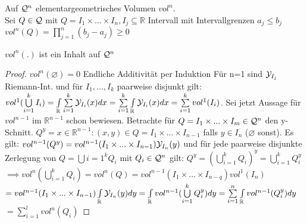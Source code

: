 \documentclass[11pt,a4paper,fleqn,openany]{report}
\begin{document}
    \begin{example}
      Auf $\mathcal{Q}^n$ elementargeometrisches Volumen $vol^n$.\\
      Sei $Q \in \mathcal{Q}$ mit $Q = I_1 \times ... \times I_n, I_j \subseteq \mathbb{R}$ Intervall mit Intervallgrenzen $a_j \leq b_j$\\
      $vol^n(Q) = \prod\limits_{j=1}^n (b_j - a_j) \geq 0$
    \end{example}

    \begin{theorem}[i.A. II.28]
      $vol^n(.)$ ist ein Inhalt auf $\mathcal{Q}^n$
    \end{theorem}

    \begin{proof}
      $vol^n(\varnothing) = 0$ \newline
      Endliche Additivität per Induktion \newline
      Für n=1 sind $\mathcal{Y}_{I_j}$ Riemann-Int. und für $I_1, ..., I_k$ paarweise disjunkt gilt: \newline
      $vol^1(\bigcup\limits_{i=1}^{k}I_i) = \int\limits_{\mathbb{R}}\sum\limits_{i=1}^{k}\mathcal{Y}_{I_i}(x) dx = \sum\limits_{i=1}^{k}\int\limits_{\mathbb{R}}\mathcal{Y}_{I_i}(x) dx = \sum\limits_{i=1}^{k}vol^1(I_i)$. \newline
      Sei jetzt Aussage für $vol^{n-1}$ im $\mathbb{R}^{n-1}$ schon bewiesen. Betrachte für $Q = I_1\times ... \times I_m \in \mathcal{Q}^n$ den y-Schnitt. \newline
      $Q^y = {x\in\mathbb{R}^{n-1}: (x,y) \in Q} = I_1\times ... \times I_{n-1}$ falls $y\in I_n$ ($\varnothing$ sonst). \newline
  Es gilt: $vol^{n-1}(Q^y) = vol^{n-1}(I_1\times ...\times I_{n-1})\mathcal{Y}_{I_n}(y)$ und für jede paarweise disjunkte Zerlegung von $Q = \bigcup\limits{i=1}^{k}Q_i$ mit $Q_i\in\mathcal{Q}^n$ gilt: \newline 
  $Q^y = (\bigcup\limits_{i=1}^{k}Q_i)^y = \bigcup\limits_{i=1}^{k}Q_i^y$ \newline
  $\implies vol^n(\bigcup\limits_{i=1}^{k}Q_i) = vol^n(Q) = vol^{n-1}(I_1\times ... \times I_{n-q})vol^1(I_n)$ \newline
  $ = vol^{n-1}(I_1\times ... \times I_{n-1})\int\limits_{\mathbb{R}}\mathcal{Y}_{I_n}(y) dy = \int\limits_{\mathbb{R}} vol^{n-1}(\bigcup\limits_{i=1}^{k}Q_i^y) dy = \sum\limits_{i=1}^{n}\int\limits_{\mathbb{R}}vol^{n-1}(Q_i^y)dy$ \newline
  $= \sum\limits_{i=1}^{l} vol^n(Q_i)$
    \end{proof}
\end{document}
